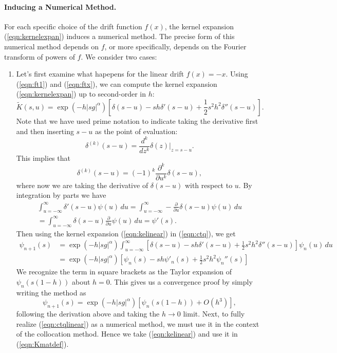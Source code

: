 \documentclass[12pt]{l4dc2021}
\begin{document}
\paragraph{Inducing a Numerical Method.} For each specific choice of the drift function $f(x)$, the kernel expansion (\ref{eqn:kernelexpan}) induces a numerical method.  The precise form of this numerical method depends on $f$, or more specifically, depends on the Fourier transform of powers of $f$.  We consider two cases:

\begin{enumerate}
\item Let's first examine what hapepens for the linear drift $f(x) = -x$.  Using (\ref{eqn:ft1}) and (\ref{eqn:ftx}), we can compute the kernel expansion  (\ref{eqn:kernelexpan}) up to second-order in $h$:
\begin{equation}
\label{eqn:kelinear}
\widetilde{K}(s,u) = \exp(-h |s g|^{\alpha})  \left[ \delta(s-u) - s h \delta'(s-u) + \frac{1}{2} s^2 h^2 \delta''(s-u) \right].
\end{equation}
Note that we have used prime notation to indicate taking the derivative first and then inserting $s-u$ as the point of evaluation:
\[
\delta^{(k)} (s-u) = \frac{d^k}{d z^k} \delta(z) \biggr|_{z=s-u}.
\]
This implies that
\[
\delta^{(k)} (s-u) = (-1)^k \frac{\partial^k}{\partial u^k} \delta(s-u),
\]
where now we are taking the derivative of $\delta(s-u)$ with respect to $u$.
By integration by parts we have
\begin{multline*}
\int_{u=-\infty}^\infty \delta'(s-u) \psi(u) \, du = 
\int_{u=-\infty}^\infty -\frac{\partial}{\partial u} \delta(s-u) \psi(u) \, du
\\
= \int_{u=-\infty}^\infty \delta(s-u) \frac{\partial}{\partial u} \psi(u) \, du
= \psi'(s).
\end{multline*}
Then using the kernel expansion (\ref{eqn:kelinear}) in (\ref{eqn:ctq}), we get
\begin{align}
\psi_{n+1}(s) &= \exp(-h |s g|^{\alpha})  \int_{u=-\infty}^\infty \left[ \delta(s-u) - s h \delta'(s-u) + \frac{1}{2} s^2 h^2 \delta''(s-u) \right] \psi_n(u) \, du \nonumber \\
\label{eqn:ctqlinear}
 &=  \exp(-h |s g|^{\alpha}) \left[ \psi_n(s) - s h \psi'_n(s) + \frac{1}{2} s^2 h^2 \psi_n''(s) \right]
 \end{align}
We recognize the term in square brackets as the Taylor expansion of $\psi_n(s(1-h))$ about $h=0$.  This gives us a convergence proof by simply writing the method as
\[
\psi_{n+1}(s) = \exp(-h |s g|^{\alpha}) \left[ \psi_n(s(1-h)) + O(h^3) \right],
\]
following the derivation above and taking the $h \to 0$ limit.  Next, to fully realize (\ref{eqn:ctqlinear}) as a numerical method, we must use it in the context of the collocation method.  Hence we take (\ref{eqn:kelinear}) and use it in (\ref{eqn:Kmatdef}).  


\end{enumerate}
\end{document}
